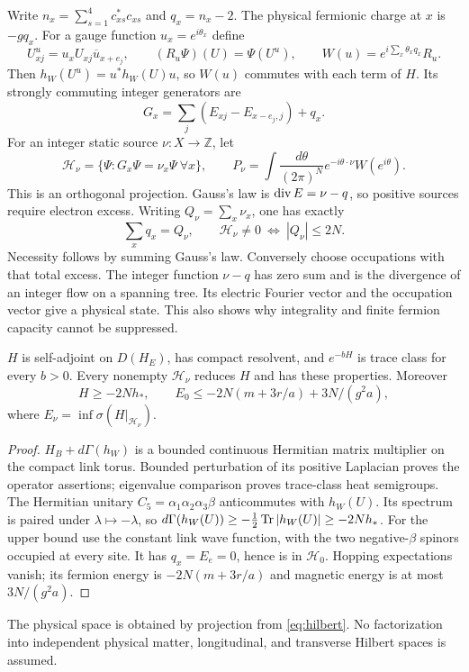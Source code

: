 Write $n_x=\sum_{s=1}^4c_{xs}^*c_{xs}$ and $q_x=n_x-2$.
The physical fermionic charge at $x$ is $-gq_x$.
For a gauge function $u_x=e^{i\theta_x}$ define
\begin{equation}
 U^u_{xj}=u_xU_{xj}\overline u_{x+e_j},\qquad
 (R_u\Psi)(U)=\Psi(U^u),\qquad
 W(u)=e^{i\sum_x\theta_xq_x}R_u.
 \label{eq:gauge-unitary}
\end{equation}
Then $h_W(U^u)=u^*h_W(U)u$, so $W(u)$ commutes with each term of
$H$. Its strongly commuting integer generators are
\begin{equation}
 G_x=\sum_j(E_{xj}-E_{x-e_j,j})+q_x.
 \label{eq:gauss}
\end{equation}
For an integer static source $\nu:X\to\mathbb Z$, let
\begin{equation}
 \mathcal H_\nu=\{\Psi:G_x\Psi=\nu_x\Psi\ \forall x\},\qquad
 P_\nu=\int\frac{d\theta}{(2\pi)^N}
          e^{-i\theta\cdot\nu}W(e^{i\theta}).
 \label{eq:projection}
\end{equation}
This is an orthogonal projection. Gauss's law is
$\operatorname{div} E=\nu-q$, so positive sources require electron excess.
Writing $Q_\nu=\sum_x\nu_x$, one has exactly
\begin{equation}
 \sum_xq_x=Q_\nu,\qquad
 \mathcal H_\nu\ne0\ \Longleftrightarrow\ |Q_\nu|\le2N.
 \label{eq:capacity}
\end{equation}
Necessity follows by summing Gauss's law. Conversely choose
occupations with that total excess. The integer function $\nu-q$
has zero sum and is the divergence of an integer flow on a
spanning tree. Its electric Fourier vector and the occupation
vector give a physical state. This also shows why integrality
and finite fermion capacity cannot be suppressed.

\begin{lemma}
\label{lem:operator}
$H$ is self-adjoint on $D(H_E)$, has compact resolvent, and
$e^{-bH}$ is trace class for every $b>0$. Every nonempty
$\mathcal H_\nu$ reduces $H$ and has these properties. Moreover
\begin{equation}
 H\ge-2Nh_*,\qquad
 E_0\le-2N(m+3r/a)+3N/(g^2a),
 \label{eq:extensive}
\end{equation}
where $E_\nu=\inf\sigma(H|_{\mathcal H_\nu})$.
\end{lemma}
\begin{proof}
$H_B+d\Gamma(h_W)$ is a bounded continuous Hermitian matrix
multiplier on the compact link torus. Bounded perturbation of its
positive Laplacian proves the operator assertions; eigenvalue
comparison proves trace-class heat semigroups.
The Hermitian unitary $C_5=\alpha_1\alpha_2\alpha_3\beta$
anticommutes with $h_W(U)$. Its spectrum is paired under
$\lambda\mapsto-\lambda$, so
$d\Gamma(h_W(U))\ge-\frac12\operatorname{Tr}|h_W(U)|\ge-2Nh_*$.
For the upper bound use the constant link wave function, with the
two negative-$\beta$ spinors occupied at every site. It has
$q_x=E_e=0$, hence is in $\mathcal H_0$.
Hopping expectations vanish; its fermion energy is
$-2N(m+3r/a)$ and magnetic energy is at most $3N/(g^2a)$.
\end{proof}

The physical space is obtained by projection from \eqref{eq:hilbert}.
No factorization into independent physical matter, longitudinal,
and transverse Hilbert spaces is assumed.
